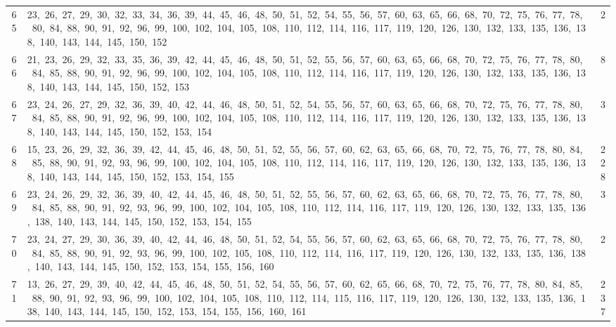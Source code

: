 \begin{longtable}{c|p{}|r}
65 & 23,\ 26,\ 27,\ 29,\ 30,\ 32,\ 33,\ 34,\ 36,\ 39,\ 44,\ 45,\ 46,\ 48,\ 50,\ 51,\ 52,\ 54,\ 55,\ 56,\ 57,\ 60,\ 63,\ 65,\ 66,\ 68,\ 70,\ 72,\ 75,\ 76,\ 77,\ 78,\ 80,\ 84,\ 88,\ 90,\ 91,\ 92,\ 96,\ 99,\ 100,\ 102,\ 104,\ 105,\ 108,\ 110,\ 112,\ 114,\ 116,\ 117,\ 119,\ 120,\ 126,\ 130,\ 132,\ 133,\ 135,\ 136,\ 138,\ 140,\ 143,\ 144,\ 145,\ 150,\ 152 & 2 \\
66 & 21,\ 23,\ 26,\ 29,\ 32,\ 33,\ 35,\ 36,\ 39,\ 42,\ 44,\ 45,\ 46,\ 48,\ 50,\ 51,\ 52,\ 55,\ 56,\ 57,\ 60,\ 63,\ 65,\ 66,\ 68,\ 70,\ 72,\ 75,\ 76,\ 77,\ 78,\ 80,\ 84,\ 85,\ 88,\ 90,\ 91,\ 92,\ 96,\ 99,\ 100,\ 102,\ 104,\ 105,\ 108,\ 110,\ 112,\ 114,\ 116,\ 117,\ 119,\ 120,\ 126,\ 130,\ 132,\ 133,\ 135,\ 136,\ 138,\ 140,\ 143,\ 144,\ 145,\ 150,\ 152,\ 153 & 8 \\
67 & 23,\ 24,\ 26,\ 27,\ 29,\ 32,\ 36,\ 39,\ 40,\ 42,\ 44,\ 46,\ 48,\ 50,\ 51,\ 52,\ 54,\ 55,\ 56,\ 57,\ 60,\ 63,\ 65,\ 66,\ 68,\ 70,\ 72,\ 75,\ 76,\ 77,\ 78,\ 80,\ 84,\ 85,\ 88,\ 90,\ 91,\ 92,\ 96,\ 99,\ 100,\ 102,\ 104,\ 105,\ 108,\ 110,\ 112,\ 114,\ 116,\ 117,\ 119,\ 120,\ 126,\ 130,\ 132,\ 133,\ 135,\ 136,\ 138,\ 140,\ 143,\ 144,\ 145,\ 150,\ 152,\ 153,\ 154 & 3 \\
68 & 15,\ 23,\ 26,\ 29,\ 32,\ 36,\ 39,\ 42,\ 44,\ 45,\ 46,\ 48,\ 50,\ 51,\ 52,\ 55,\ 56,\ 57,\ 60,\ 62,\ 63,\ 65,\ 66,\ 68,\ 70,\ 72,\ 75,\ 76,\ 77,\ 78,\ 80,\ 84,\ 85,\ 88,\ 90,\ 91,\ 92,\ 93,\ 96,\ 99,\ 100,\ 102,\ 104,\ 105,\ 108,\ 110,\ 112,\ 114,\ 116,\ 117,\ 119,\ 120,\ 126,\ 130,\ 132,\ 133,\ 135,\ 136,\ 138,\ 140,\ 143,\ 144,\ 145,\ 150,\ 152,\ 153,\ 154,\ 155 & 228 \\
69 & 23,\ 24,\ 26,\ 29,\ 32,\ 36,\ 39,\ 40,\ 42,\ 44,\ 45,\ 46,\ 48,\ 50,\ 51,\ 52,\ 55,\ 56,\ 57,\ 60,\ 62,\ 63,\ 65,\ 66,\ 68,\ 70,\ 72,\ 75,\ 76,\ 77,\ 78,\ 80,\ 84,\ 85,\ 88,\ 90,\ 91,\ 92,\ 93,\ 96,\ 99,\ 100,\ 102,\ 104,\ 105,\ 108,\ 110,\ 112,\ 114,\ 116,\ 117,\ 119,\ 120,\ 126,\ 130,\ 132,\ 133,\ 135,\ 136,\ 138,\ 140,\ 143,\ 144,\ 145,\ 150,\ 152,\ 153,\ 154,\ 155 & 3 \\
70 & 23,\ 24,\ 27,\ 29,\ 30,\ 36,\ 39,\ 40,\ 42,\ 44,\ 46,\ 48,\ 50,\ 51,\ 52,\ 54,\ 55,\ 56,\ 57,\ 60,\ 62,\ 63,\ 65,\ 66,\ 68,\ 70,\ 72,\ 75,\ 76,\ 77,\ 78,\ 80,\ 84,\ 85,\ 88,\ 90,\ 91,\ 92,\ 93,\ 96,\ 99,\ 100,\ 102,\ 105,\ 108,\ 110,\ 112,\ 114,\ 116,\ 117,\ 119,\ 120,\ 126,\ 130,\ 132,\ 133,\ 135,\ 136,\ 138,\ 140,\ 143,\ 144,\ 145,\ 150,\ 152,\ 153,\ 154,\ 155,\ 156,\ 160 & 2 \\
71 & 13,\ 26,\ 27,\ 29,\ 39,\ 40,\ 42,\ 44,\ 45,\ 46,\ 48,\ 50,\ 51,\ 52,\ 54,\ 55,\ 56,\ 57,\ 60,\ 62,\ 65,\ 66,\ 68,\ 70,\ 72,\ 75,\ 76,\ 77,\ 78,\ 80,\ 84,\ 85,\ 88,\ 90,\ 91,\ 92,\ 93,\ 96,\ 99,\ 100,\ 102,\ 104,\ 105,\ 108,\ 110,\ 112,\ 114,\ 115,\ 116,\ 117,\ 119,\ 120,\ 126,\ 130,\ 132,\ 133,\ 135,\ 136,\ 138,\ 140,\ 143,\ 144,\ 145,\ 150,\ 152,\ 153,\ 154,\ 155,\ 156,\ 160,\ 161 & 237 \\

\end{longtable}
